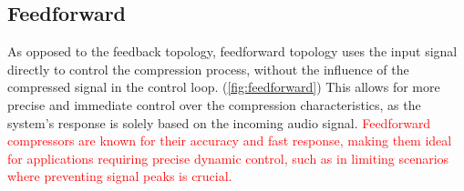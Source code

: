 \documentclass[10pt]{article}
\begin{document}
\begin{multicols}{2}
\begin{minipage}{\linewidth}
                        
                    \label{fig:feedback}
                
                \end{minipage}
                
            \subsection{Feedforward}
                As opposed to the feedback topology, feedforward topology uses the input signal directly to control the compression process, without the influence of the compressed signal in the control loop. (\ref{fig:feedforward}) This allows for more precise and immediate control over the compression characteristics, as the system's response is solely based on the incoming audio signal. \textcolor{red}{Feedforward compressors are known for their accuracy and fast response, making them ideal for applications requiring precise dynamic control, such as in limiting scenarios where preventing signal peaks is crucial.}\par


\end{multicols}
\end{document}
